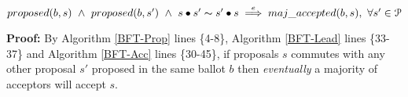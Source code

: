 \begin{lemma}
$proposed(b,s)\ \land\ proposed(b,s')\ \land\ s\bullet s' \thicksim  s' \bullet s \overset{e}{\implies} maj\_accepted(b,s),\ \forall s' \in \mathcal{P}$ \label{L-L1}
\end{lemma}
\textbf{Proof:} By Algorithm \ref{BFT-Prop} lines \{4-8\}, Algorithm \ref{BFT-Lead} lines \{33-37\} and Algorithm \ref{BFT-Acc} lines \{30-45\}, if proposals $s$ commutes with any other proposal $s'$ proposed in the same ballot $b$ then \textit{eventually} a majority of acceptors will accept $s$. \par